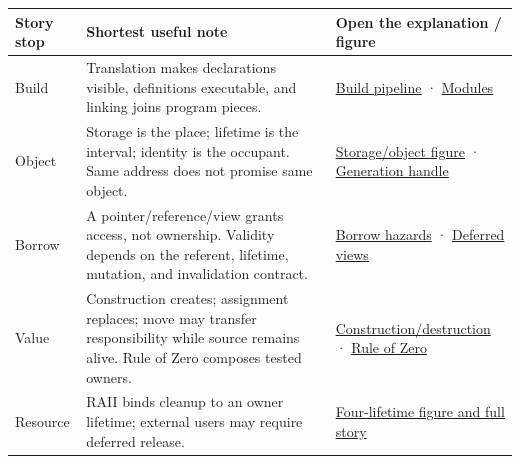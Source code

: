 {\def\LTcaptype{none} %
\begin{longtable}[]{@{}
  >{\raggedright\arraybackslash}p{}
  >{\raggedright\arraybackslash}p{}
  >{\raggedright\arraybackslash}p{}@{}}
\toprule\noalign{}
\begin{minipage}[b]{\linewidth}\raggedright
Story stop
\end{minipage} & \begin{minipage}[b]{\linewidth}\raggedright
Shortest useful note
\end{minipage} & \begin{minipage}[b]{\linewidth}\raggedright
Open the explanation / figure
\end{minipage} \\
\midrule\noalign{}
\endhead
\bottomrule\noalign{}
\endlastfoot
Build & Translation makes declarations visible, definitions executable, and linking joins program pieces. & \hyperref[01-foundations-i-ch002-the-journey-from-text-to-a-live-object]{Build pipeline} · \hyperref[01-foundations-i-ch002-a-compiled-interface-rather-than-repeated-text]{Modules} \\
Object & Storage is the place; lifetime is the interval; identity is the occupant. Same address does not promise same object. & \hyperref[01-foundations-i-ch002-storage-is-a-place-an-object-is-its-occupant]{Storage/object figure} · \hyperref[01-foundations-i-ch002-a-handle-remembers-which-occupant-was-intended]{Generation handle} \\
Borrow & A pointer/reference/view grants access, not ownership. Validity depends on the referent, lifetime, mutation, and invalidation contract. & \hyperref[01-foundations-i-ch003-when-a-valid-borrow-stops-naming-the-intended-thing]{Borrow hazards} · \hyperref[01-foundations-i-ch003-borrowed-views-and-deferred-work-need-an-owner-story]{Deferred views} \\
Value & Construction creates; assignment replaces; move may transfer responsibility while source remains alive. Rule of Zero composes tested owners. & \hyperref[01-foundations-i-ch003-construction-establishes-a-usable-state]{Construction/destruction} · \hyperref[01-foundations-i-ch003-from-three-repairs-to-five-decisions-to-zero-boilerplate]{Rule of Zero} \\
Resource & RAII binds cleanup to an owner lifetime; external users may require deferred release. & \hyperref[01-foundations-i-ch004-from-a-live-object-to-responsible-resource-ownership]{Four-lifetime figure and full story} \\

\end{longtable}}
